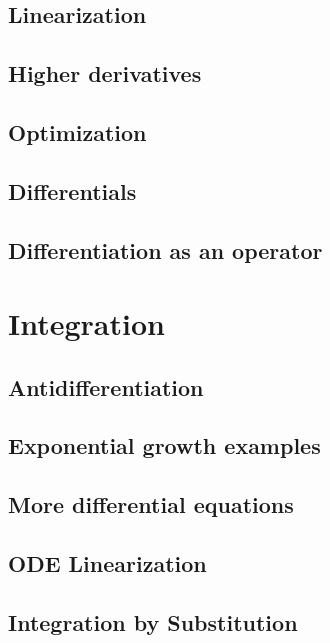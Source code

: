 \documentclass{book}
\begin{document}
\begin{sloppypar}
\section{Linearization} \label{ChDifferentiationSecLinearization}
\section{Higher derivatives} \label{ChDifferentiationSecHigherDerivatives}
\section{Optimization} \label{ChDifferentiationSecOptimization}
\section{Differentials} \label{ChDifferentiationSecDifferentials}
\section{Differentiation as an operator} \label{ChDifferentiationSecDifferentiationAsAnOperator}

\chapter{Integration} \label{ChIntegration}
\section{Antidifferentiation} \label{ChIntegrationSecAntidifferentiation}
\section{Exponential growth examples} \label{ChIntegrationSecExponentialGrowthExamples}
\section{More differential equations} \label{ChIntegrationSecMoreDifferentialEquations}
\section{ODE Linearization} \label{ChIntegrationSecODELinearization}
\section{Integration by Substitution} \label{ChIntegrationSecIntegrationBySubstitution}

\end{sloppypar}
\end{document}
